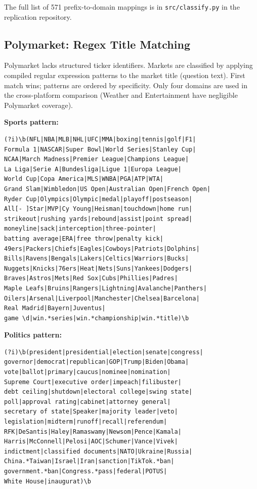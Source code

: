 \documentclass[11pt,a4paper]{article}
\begin{document}
\noindent The full list of 571 prefix-to-domain mappings is in \texttt{src/classify.py} in the replication repository.

\subsection{Polymarket: Regex Title Matching}\label{sec:poly_class}

Polymarket lacks structured ticker identifiers. Markets are classified by applying compiled regular expression patterns to the market title (question text). First match wins; patterns are ordered by specificity. Only four domains are used in the cross-platform comparison (Weather and Entertainment have negligible Polymarket coverage).

\vspace{0.5em}
\noindent\textbf{Sports pattern:}
\begin{lstlisting}
(?i)\b(NFL|NBA|MLB|NHL|UFC|MMA|boxing|tennis|golf|F1|
Formula 1|NASCAR|Super Bowl|World Series|Stanley Cup|
NCAA|March Madness|Premier League|Champions League|
La Liga|Serie A|Bundesliga|Ligue 1|Europa League|
World Cup|Copa America|MLS|WNBA|PGA|ATP|WTA|
Grand Slam|Wimbledon|US Open|Australian Open|French Open|
Ryder Cup|Olympics|Olympic|medal|playoff|postseason|
All[- ]Star|MVP|Cy Young|Heisman|touchdown|home run|
strikeout|rushing yards|rebound|assist|point spread|
moneyline|sack|interception|three-pointer|
batting average|ERA|free throw|penalty kick|
49ers|Packers|Chiefs|Eagles|Cowboys|Patriots|Dolphins|
Bills|Ravens|Bengals|Lakers|Celtics|Warriors|Bucks|
Nuggets|Knicks|76ers|Heat|Nets|Suns|Yankees|Dodgers|
Braves|Astros|Mets|Red Sox|Cubs|Phillies|Padres|
Maple Leafs|Bruins|Rangers|Lightning|Avalanche|Panthers|
Oilers|Arsenal|Liverpool|Manchester|Chelsea|Barcelona|
Real Madrid|Bayern|Juventus|
game \d|win.*series|win.*championship|win.*title)\b
\end{lstlisting}

\noindent\textbf{Politics pattern:}
\begin{lstlisting}
(?i)\b(president|presidential|election|senate|congress|
governor|democrat|republican|GOP|Trump|Biden|Obama|
vote|ballot|primary|caucus|nominee|nomination|
Supreme Court|executive order|impeach|filibuster|
debt ceiling|shutdown|electoral college|swing state|
poll|approval rating|cabinet|attorney general|
secretary of state|Speaker|majority leader|veto|
legislation|midterm|runoff|recall|referendum|
RFK|DeSantis|Haley|Ramaswamy|Newsom|Pence|Kamala|
Harris|McConnell|Pelosi|AOC|Schumer|Vance|Vivek|
indictment|classified documents|NATO|Ukraine|Russia|
China.*Taiwan|Israel|Iran|sanction|TikTok.*ban|
government.*ban|Congress.*pass|federal|POTUS|
White House|inaugurat)\b
\end{lstlisting}
\end{document}
